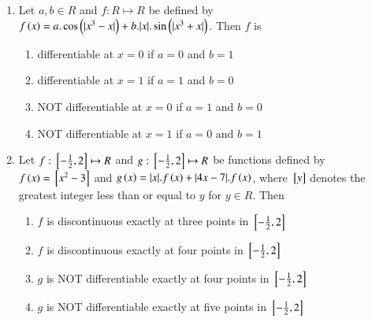 \documentclass[journal,12pt,twocolumn]{IEEEtran}
\theoremstyle{remark}
\begin{document}
\begin{enumerate}
    \item 
    Let $a, b\in R$ and $f: R\mapsto R$ be defined by $f\left(x\right)=a.\cos \left(|x^3-x|\right) +b.|x|.\sin \left(|x^3+x|\right)$. Then $f$ is   
        
    \hfill 
    {}
    
    \begin{enumerate}[label=(\alph*)]
        
        \item differentiable at $x=0$ if $a=0$ and $b=1$
        \item differentiable at $x=1$ if $a=1$ and $b=0$
        \item {NOT} differentiable at $x=0$ if $a=1$ and $b=0$
        \item {NOT} differentiable at $x=1$ if $a=0$ and $b=1$
    \end{enumerate}


    \item 
    Let $f:{}\left[-\frac{1}{2}, 2\right]\mapsto R$ and $g:{}\left[-\frac{1}{2}, 2\right]\mapsto R$ be functions defined by $f\left(x\right)={}\left[x^2-3\right]$ and $g\left(x\right)=|x|.f\left(x\right)+|4x-7|.f\left(x\right)$, where ${}\left[y\right]$ denotes the greatest integer less than or equal to $y$ for $y\in R$. Then   
        
    \hfill 
    {}
    
    \begin{enumerate}[label=(\alph*)]
        
        \item $f$ is discontinuous exactly at three points in ${}\left[-\frac{1}{2}, 2\right]$
        \item $f$ is discontinuous exactly at four points in ${}\left[-\frac{1}{2}, 2\right]$
        \item $g$ is NOT differentiable exactly at four points in ${}\left[-\frac{1}{2}, 2\right]$
        \item $g$ is NOT differentiable exactly at five points in ${}\left[-\frac{1}{2}, 2\right]$
    \end{enumerate}

\end{enumerate}
\end{document}
